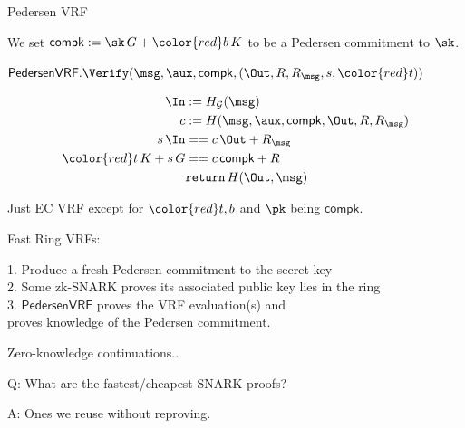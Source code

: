 \documentclass{beamer}
\def\compk{\ensuremath{\mathsf{compk}}\xspace}
\begin{document}
\begin{frame}{Pedersen VRF}

We set $\compk := \sk \, G + {\color{red} b \, K}$ to be a Pedersen commitment to $\sk$.

\bigskip\bigskip

$\mathsf{PedersenVRF}.\Verify(\msg,\aux,\compk,(\Out,R,R_\msg,s,{\color{red} t}))$
	
$$ \begin{aligned}
\In &:= H_{\mathcal{G}}(\msg) \\
c &:= H(\msg,\aux,\compk,\Out,R,R_\msg) \\
s \, \In &== c \, \Out + R_\msg \\
{\color{red} t \, K} + s \, G &== c \, \compk + R \\
& \mathtt{return} \, H(\Out,\msg) \\
\end{aligned} $$

\bigskip \bigskip

Just EC VRF except for $\color{red} t, b$ and $\pk$ being $\compk$.

\end{frame}



\begin{frame}

Fast Ring VRFs: \\ \smallskip

1. Produce a fresh Pedersen commitment to the secret key \\
2. Some zk-SNARK proves its associated public key lies in the ring \\
3. $\mathsf{PedersenVRF}$ proves the VRF evaluation(s) and \\
\hspace{10pt}  proves knowledge of the Pedersen commitment. \\

\end{frame}



\begin{frame}
	
Zero-knowledge continuations..
	
\bigskip
	
Q: What are the fastest/cheapest SNARK proofs?
	
\bigskip
	
A: Ones we reuse without reproving.
	
\end{frame}
\end{document}
